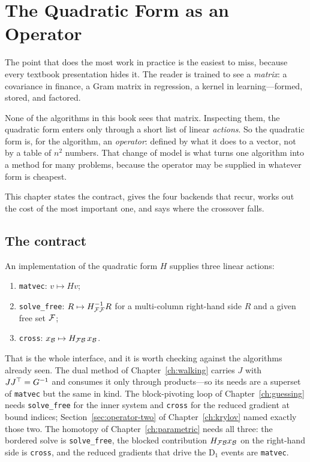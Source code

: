 \chapter{The Quadratic Form as an Operator}
\label{ch:operator}

The point that does the most work in practice is the easiest to miss, because every
textbook presentation hides it. The reader is trained to see a \emph{matrix}: a
covariance in finance, a Gram matrix in regression, a kernel in learning---formed,
stored, and factored.

None of the algorithms in this book sees that matrix. Inspecting them,
the quadratic form enters only through a short list of linear \emph{actions}. So the
quadratic form is, for the algorithm, an \emph{operator}: defined by what it does to a
vector, not by a table of $n^2$ numbers. That change of model is what turns one
algorithm into a method for many problems, because the operator may be supplied in
whatever form is cheapest.

This chapter states the contract, gives the four backends that recur, works out the
cost of the most important one, and says where the crossover falls.

\section{The contract}

\begin{definition}
\label{def:qform}
An implementation of the quadratic form $H$ supplies three linear actions:
\begin{enumerate}
\item \texttt{matvec}: $v \mapsto Hv$;
\item \texttt{solve\_free}: $R \mapsto H_{\mathcal{F}\mathcal{F}}^{-1}R$ for a multi-column
      right-hand side $R$ and a given free set $\mathcal{F}$;
\item \texttt{cross}: $x_{\mathcal{B}} \mapsto H_{\mathcal{F}\mathcal{B}}\,x_{\mathcal{B}}$.
\end{enumerate}
\end{definition}

That is the whole interface, and it is worth checking against the algorithms already
seen. The dual method of Chapter~\ref{ch:walking} carries $J$ with $JJ^{\top} = G^{-1}$ and
consumes it only through products---so its needs are a superset of \texttt{matvec} but
the same in kind. The block-pivoting loop of Chapter~\ref{ch:guessing} needs
\texttt{solve\_free} for the inner system and \texttt{cross} for the reduced gradient
at bound indices; Section~\ref{sec:operator-two} of Chapter~\ref{ch:krylov} named
exactly those two. The homotopy of Chapter~\ref{ch:parametric} needs all three: the
bordered solve is \texttt{solve\_free}, the blocked contribution
$H_{\mathcal{F}\mathcal{B}}x_{\mathcal{B}}$ on the right-hand side is \texttt{cross}, and the reduced
gradients that drive the $\mathrm{D}_1$ events are \texttt{matvec}.

